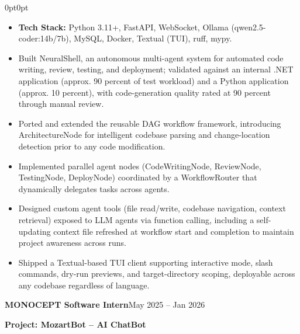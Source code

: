 \documentclass[10pt, letterpaper]{article}
\newenvironment{onecolentry}{
    \begin{adjustwidth}{0pt}{0pt}
}{
    \end{adjustwidth}
}
\newenvironment{highlights}{
    \begin{itemize}[topsep=2pt, parsep=0pt, partopsep=0pt, itemsep=2pt, leftmargin=0.8cm]
}{
    \end{itemize}
}
\newcommand{\headerrow}[2]{%
    \noindent\textbf{#1}\hfill #2\par%
}
\begin{document}
\vspace{-2pt}
\begin{onecolentry}
\begin{highlights}
    \item \textbf{Tech Stack:} Python 3.11+, FastAPI, WebSocket, Ollama (qwen2.5-coder:14b/7b), MySQL, Docker, Textual (TUI), ruff, mypy.
    \item Built NeuralShell, an autonomous multi-agent system for automated code writing, review, testing, and deployment; validated against an internal .NET application (approx. 90 percent of test workload) and a Python application (approx. 10 percent), with code-generation quality rated at 90 percent through manual review.
    \item Ported and extended the reusable DAG workflow framework, introducing ArchitectureNode for intelligent codebase parsing and change-location detection prior to any code modification.
    \item Implemented parallel agent nodes (CodeWritingNode, ReviewNode, TestingNode, DeployNode) coordinated by a WorkflowRouter that dynamically delegates tasks across agents.
    \item Designed custom agent tools (file read/write, codebase navigation, context retrieval) exposed to LLM agents via function calling, including a self-updating context file refreshed at workflow start and completion to maintain project awareness across runs.
    \item Shipped a Textual-based TUI client supporting interactive mode, slash commands, dry-run previews, and target-directory scoping, deployable across any codebase regardless of language.
\end{highlights}
\end{onecolentry}

\vspace{6pt}
\headerrow{MONOCEPT \textbar{} Software Intern}{May 2025 -- Jan 2026}
\headerrow{Project: MozartBot -- AI ChatBot}{}
\end{document}
